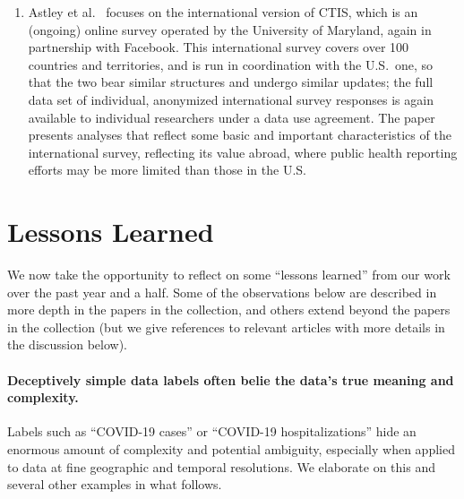\documentclass{article}
\begin{document}
\begin{enumerate}
\item Astley et al.\ \citep{Astley:2021} focuses on the international version of
  CTIS, which is an (ongoing) online survey operated by the University of
  Maryland, again in partnership with Facebook.  This international survey
  covers over 100 countries and territories, and is run in coordination with the
  U.S.\ one, so that the two bear similar structures and undergo similar
  updates; the full data set of individual, anonymized international survey
  responses is again available to individual researchers under a data use
  agreement.  The paper presents analyses that reflect some basic and important
  characteristics of the international survey, reflecting its value abroad,
  where public health reporting efforts may be more limited than those in the
  U.S. 
\end{enumerate}

\section{Lessons Learned}

We now take the opportunity to reflect on some ``lessons learned'' from our work
over the past year and a half.  Some of the observations below are described in
more depth in the papers in the collection, and others extend beyond the papers
in the collection (but we give references to relevant articles with more details
in the discussion below). 

\paragraph{Deceptively simple data labels often belie the data's true meaning
  and complexity.}

Labels such as ``COVID-19 cases'' or ``COVID-19 hospitalizations'' hide an
enormous amount of complexity and potential ambiguity, especially when applied
to data at fine geographic and temporal resolutions.  We elaborate on this and
several other examples in what follows. 
\end{document}
